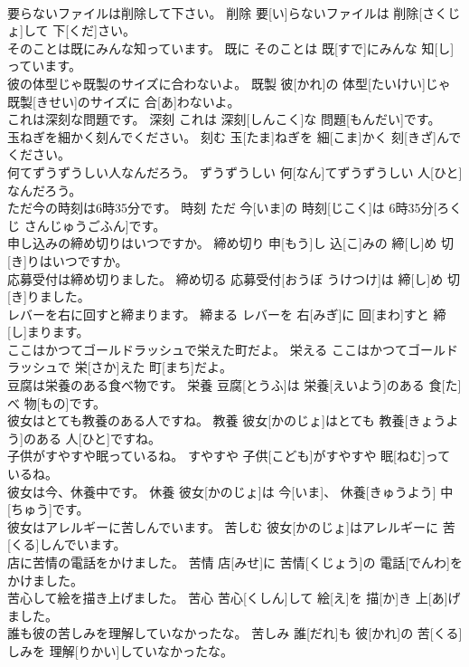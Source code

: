 \documentclass[8pt]{extreport}
\begin{document}
\begin{CJK}{UTF8}{min}
\\	要らないファイルは削除して下さい。	削除	要[い]らないファイルは 削除[さくじょ]して 下[くだ]さい。	
\\	そのことは既にみんな知っています。	既に	そのことは 既[すで]にみんな 知[し]っています。	
\\	彼の体型じゃ既製のサイズに合わないよ。	既製	彼[かれ]の 体型[たいけい]じゃ 既製[きせい]のサイズに 合[あ]わないよ。	
\\	これは深刻な問題です。	深刻	これは 深刻[しんこく]な 問題[もんだい]です。	
\\	玉ねぎを細かく刻んでください。	刻む	玉[たま]ねぎを 細[こま]かく 刻[きざ]んでください。	
\\	何てずうずうしい人なんだろう。	ずうずうしい	何[なん]てずうずうしい 人[ひと]なんだろう。	
\\	ただ今の時刻は6時35分です。	時刻	ただ 今[いま]の 時刻[じこく]は 6時35分[ろくじ さんじゅうごふん]です。	
\\	申し込みの締め切りはいつですか。	締め切り	申[もう]し 込[こ]みの 締[し]め 切[き]りはいつですか。	
\\	応募受付は締め切りました。	締め切る	応募受付[おうぼ うけつけ]は 締[し]め 切[き]りました。	
\\	レバーを右に回すと締まります。	締まる	レバーを 右[みぎ]に 回[まわ]すと 締[し]まります。	
\\	ここはかつてゴールドラッシュで栄えた町だよ。	栄える	ここはかつてゴールドラッシュで 栄[さか]えた 町[まち]だよ。	
\\	豆腐は栄養のある食べ物です。	栄養	豆腐[とうふ]は 栄養[えいよう]のある 食[た]べ 物[もの]です。	
\\	彼女はとても教養のある人ですね。	教養	彼女[かのじょ]はとても 教養[きょうよう]のある 人[ひと]ですね。	
\\	子供がすやすや眠っているね。	すやすや	子供[こども]がすやすや 眠[ねむ]っているね。	
\\	彼女は今、休養中です。	休養	彼女[かのじょ]は 今[いま]、 休養[きゅうよう] 中[ちゅう]です。	
\\	彼女はアレルギーに苦しんでいます。	苦しむ	彼女[かのじょ]はアレルギーに 苦[くる]しんでいます。	
\\	店に苦情の電話をかけました。	苦情	店[みせ]に 苦情[くじょう]の 電話[でんわ]をかけました。	
\\	苦心して絵を描き上げました。	苦心	苦心[くしん]して 絵[え]を 描[か]き 上[あ]げました。	
\\	誰も彼の苦しみを理解していなかったな。	苦しみ	誰[だれ]も 彼[かれ]の 苦[くる]しみを 理解[りかい]していなかったな。	

\end{CJK}
\end{document}

